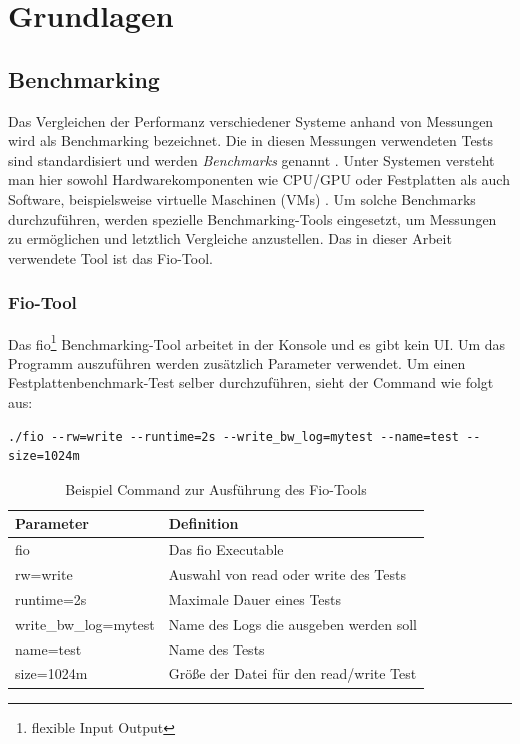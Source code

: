 \chapter{Grundlagen}
\label{cha:Grundlagen}


\section{Benchmarking}

Das Vergleichen der Performanz verschiedener Systeme anhand von Messungen wird als Benchmarking bezeichnet. 
Die in diesen Messungen verwendeten Tests sind standardisiert und werden \textit{Benchmarks} genannt \cite{defi_benchmarking}.
Unter Systemen versteht man hier sowohl Hardwarekomponenten wie CPU/GPU \cite{wang2019benchmarkingtpugpucpu} oder Festplatten \cite{ssd_benchmark} als auch Software, 
beispielsweise virtuelle Maschinen (VMs) \cite{statistically_rigorous}. Um solche Benchmarks durchzuführen, werden spezielle Benchmarking-Tools eingesetzt, 
um Messungen zu ermöglichen und letztlich Vergleiche anzustellen. Das in dieser Arbeit verwendete Tool ist das Fio-Tool.

\subsection{Fio-Tool}
Das fio\footnote{flexible Input Output} \cite{axboe} Benchmarking-Tool arbeitet in der Konsole und es gibt kein UI.
Um das Programm auszuführen werden zusätzlich Parameter verwendet.
Um einen Festplattenbenchmark-Test selber durchzuführen, sieht der Command wie folgt aus:

\begin{lstlisting}[caption=Beispiel für eine Ausführung eines fio-jobs, label={lst:job}]
  ./fio --rw=write --runtime=2s --write_bw_log=mytest --name=test --size=1024m
\end{lstlisting}


\begin{center}
  \begin{table}[h!]
    \begin{tabularx}{\textwidth}{|X|X|}
      \hline
        \textbf{Parameter}& \textbf{Definition} \\ 
      \hline
      fio & Das fio Executable  \\ 
      \hline
      rw=write & Auswahl von read oder write des Tests  \\ 
      \hline
      runtime=2s & Maximale Dauer eines Tests  \\ 
      \hline
      write\_bw\_log=mytest &  Name des Logs die ausgeben werden soll   \\ 
      \hline
      name=test &  Name des Tests   \\ 
      \hline
      size=1024m & Größe der Datei für den read/write Test    \\ 
      \hline
    \end{tabularx}
    \caption{Beispiel Command zur Ausführung des Fio-Tools}
    \label{tab:1d_1_sta}
  \end{table}
\end{center}

